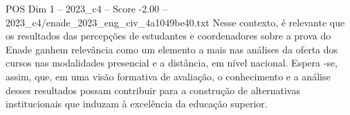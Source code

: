 \begin{textsample}{POS Dim 1 – 2023\_c4 – Score -2.00 – 2023\_c4/enade\_2023\_eng\_civ\_4a1049be40.txt}
Nesse contexto, é relevante que os resultados das percepções de estudantes e coordenadores sobre a prova do Enade ganhem relevância como um elemento a mais nas análises da oferta dos cursos nas modalidades presencial e a distância, em nível nacional.
Espera -se, assim, que, em uma visão formativa de avaliação, o conhecimento e a análise desses resultados possam contribuir para a construção de alternativas institucionais que induzam à excelência da educação superior.

\end{textsample}

